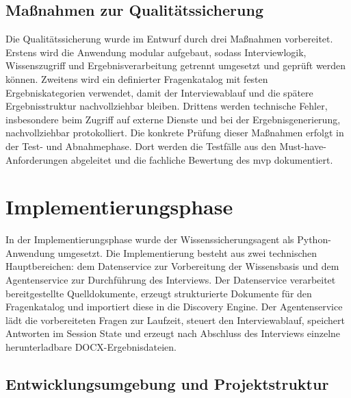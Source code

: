 \documentclass[
  10pt,
  ngerman,
  a4paper,
  toc=graduated,
  numbers=noenddot,
  headings=standardclasses,
  nonumberlist
]{scrartcl}
\begin{document}
\subsection{Maßnahmen zur Qualitätssicherung}
\label{massnahmen_zur_qualitaetssicherung}

Die Qualitätssicherung wurde im Entwurf durch drei Maßnahmen vorbereitet. Erstens wird die Anwendung modular aufgebaut, sodass Interviewlogik, Wissenszugriff und Ergebnisverarbeitung getrennt umgesetzt und geprüft werden können. Zweitens wird ein definierter Fragenkatalog mit festen Ergebniskategorien verwendet, damit der Interviewablauf und die spätere Ergebnisstruktur nachvollziehbar bleiben. Drittens werden technische Fehler, insbesondere beim Zugriff auf externe Dienste und bei der Ergebnisgenerierung, nachvollziehbar protokolliert. Die konkrete Prüfung dieser Maßnahmen erfolgt in der Test- und Abnahmephase. Dort werden die Testfälle aus den Must-have-Anforderungen abgeleitet und die fachliche Bewertung des \gls{mvp} dokumentiert.


\section{Implementierungsphase}
\label{implementierungsphase}

In der Implementierungsphase wurde der Wissenssicherungsagent als Python-Anwendung umgesetzt. Die Implementierung besteht aus zwei technischen Hauptbereichen: dem Datenservice zur Vorbereitung der Wissensbasis und dem Agentenservice zur Durchführung des Interviews. Der Datenservice verarbeitet bereitgestellte Quelldokumente, erzeugt strukturierte Dokumente für den Fragenkatalog und importiert diese in die Discovery Engine. Der Agentenservice lädt die vorbereiteten Fragen zur Laufzeit, steuert den Interviewablauf, speichert Antworten im Session State und erzeugt nach Abschluss des Interviews einzelne herunterladbare DOCX-Ergebnisdateien. 

\subsection{Entwicklungsumgebung und Projektstruktur}
\label{entwicklungsumgebung_und_projektstruktur}
\end{document}
